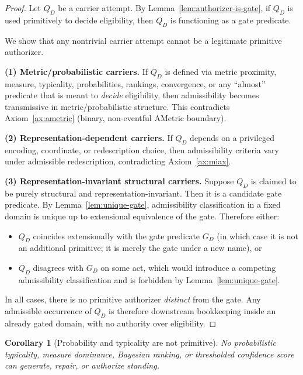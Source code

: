 \documentclass[12pt]{article}
\newtheorem{corollary}{Corollary}
\begin{document}
\begin{proof}
Let $Q_D$ be a carrier attempt. By Lemma~\ref{lem:authorizer-is-gate}, if $Q_D$ is used primitively to decide eligibility, then $Q_D$ is functioning as a gate predicate.

We show that any nontrivial carrier attempt cannot be a legitimate primitive authorizer.

\textbf{(1) Metric/probabilistic carriers.} If $Q_D$ is defined via metric proximity, measure, typicality, probabilities, rankings, convergence, or any
``almost'' predicate that is meant to \emph{decide} eligibility, then admissibility becomes transmissive in metric/probabilistic structure.
This contradicts Axiom~\ref{ax:ametric} (binary, non-eventful AMetric boundary).

\textbf{(2) Representation-dependent carriers.} If $Q_D$ depends on a privileged encoding, coordinate, or redescription choice, then admissibility criteria vary under admissible redescription,
contradicting Axiom~\ref{ax:miax}.

\textbf{(3) Representation-invariant structural carriers.} Suppose $Q_D$ is claimed to be purely structural and representation-invariant.
Then it is a candidate gate predicate. By Lemma~\ref{lem:unique-gate}, admissibility classification in a fixed domain is unique up to extensional equivalence of the gate.
Therefore either:
\begin{itemize}[leftmargin=2.2em]
\item $Q_D$ coincides extensionally with the gate predicate $G_D$ (in which case it is not an additional primitive; it is merely the gate under a new name), or
\item $Q_D$ disagrees with $G_D$ on some act, which would introduce a competing admissibility classification and is forbidden by Lemma~\ref{lem:unique-gate}.
\end{itemize}

In all cases, there is no primitive authorizer \emph{distinct} from the gate. Any admissible occurrence of $Q_D$ is therefore downstream bookkeeping inside an already gated domain, with no authority over eligibility.

\end{proof}

\begin{corollary}[Probability and typicality are not primitive]
\label{cor:prob}
No probabilistic typicality, measure dominance, Bayesian ranking, or thresholded confidence score can generate, repair, or authorize standing.
\end{corollary}
\end{document}
